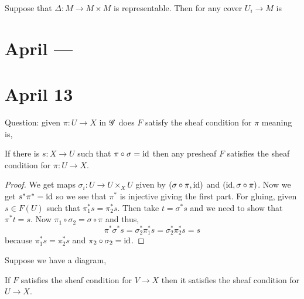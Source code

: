 \documentclass[12pt]{article}
\begin{document}
\begin{rmk}
Suppose that $\Delta : M \to M \times M$ is representable. Then for any cover $U_i \to M$ is 
\end{rmk}

\section{April ---}

\section{April 13}

Question: given $\pi : U \to X$ in $\mathscr{G}$ does $F$ satisfy the sheaf condition for $\pi$ meaning is,
\begin{center}
\end{center}

\begin{theorem}
If there is $s : X \to U$ such that $\pi \circ \sigma = \mathrm{id}$ then any presheaf $F$ satisfies the sheaf condition for $\pi : U \to X$. 
\end{theorem}

\begin{proof}
We get maps $\sigma_i : U \to U \times_X U$ given by $(\sigma \circ \pi, \mathrm{id})$ and $(\mathrm{id}, \sigma \circ \pi)$. Now we get $s^* \pi^* = \mathrm{id}$ so we see that $\pi^*$ is injective giving the first part. For gluing, given $s \in F(U)$ such that $\pi_1^* s = \pi_2^* s$. Then take $t = \sigma^* s$ and we need to show that $\pi^* t = s$.  Now $\pi_1 \circ \sigma_2 = \sigma \circ \pi$ and thus,
\[ \pi^* \sigma^* s = \sigma_2^* \pi_1^* s = \sigma_2^* \pi_2^* s = s \]
because $\pi_1^* s = \pi_2^* s$ and $\pi_2 \circ \sigma_2 = \mathrm{id}$.
\end{proof}

\begin{cor}
Suppose we have a diagram,
\begin{center}
\end{center}
If $F$ satisfies the sheaf condition for $V \to X$ then it satisfies the sheaf condition for $U \to X$. 
\end{cor}
\end{document}
